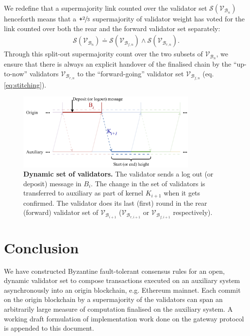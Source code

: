 \documentclass[12pt,a4paper]{article}
\begin{document}
We redefine that a supermajority link counted over the validator set $\mathcal{S}(\mathcal{V}_{\mathcal{B}_n})$ henceforth means that a $\texttt{+}\sfrac{2}{3}$ supermajority of validator weight has voted for the link counted over both the rear and the forward validator set separately:
\begin{align}
  \label{eq:supermajority}
  \mathcal{S}(\mathcal{V}_{\mathcal{B}_n}) \doteq \mathcal{S}(\mathcal{V}_{\mathcal{B}_{f,n}}) \land \mathcal{S}(\mathcal{V}_{\mathcal{B}_{r,n}}).
\end{align}
Through this split-out supermajority count over the two subsets of $\mathcal{V}_{\mathcal{B}_{n}}$, we ensure that there is always an explicit handover of the finalised chain by the ``up-to-now'' validators $\mathcal{V}_{\mathcal{B}_{r,n}}$ to the ``forward-going'' validator set $\mathcal{V}_{\mathcal{B}_{f,n}}$ (eq. \ref{eq:stitching}).
\begin{figure}[htb]
    \centering
	\includegraphics[width=0.8\textwidth]{dynamic_validators}
	\caption{\textbf{Dynamic set of validators.}
		The validator sends a log out (or deposit) message in $B_i$.
		The change in the set of validators is transferred to auxiliary as part of kernel $K_{i+1}$ when it gets confirmed.
		The validator does its last (first) round in the rear (forward) validator set of $\mathcal{V}_{\mathcal{B}_{i+1}}$ ($\mathcal{V}_{\mathcal{B}_{r,i+1}}$ or $\mathcal{V}_{\mathcal{B}_{f,i+1}}$ respectively).}
	\label{fig:dynamic_validators}
\end{figure}

\section*{Conclusion}
We have constructed Byzantine fault-tolerant consensus rules for an open, dynamic validator set to compose transactions executed on an auxiliary system asynchronously into an origin blockchain, e.g. Ethereum mainnet.
Each commit on the origin blockchain by a supermajority of the validators can span an arbitrarily large measure of computation finalised on the auxiliary system. A working draft formulation of implementation work done on the gateway protocol is appended to this document.
\end{document}
